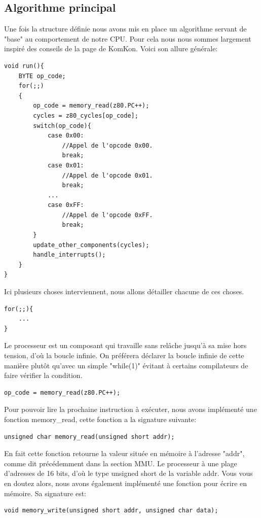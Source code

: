\documentclass[french]{report}
\begin{document}
\subsection{Algorithme principal}
Une fois la structure définie nous avons mis en place un algorithme servant de "base" au comportement de notre CPU. Pour cela nous nous sommes largement inspiré des conseils de la page de KomKon\cite{komkon}. Voici son allure générale:
 \begin{lstlisting}
void run(){
	BYTE op_code;
	for(;;)
	{
		op_code = memory_read(z80.PC++);
		cycles = z80_cycles[op_code];
		switch(op_code){	
			case 0x00:
				//Appel de l'opcode 0x00.
				break;
			case 0x01:
				//Appel de l'opcode 0x01.
				break;
			...
			case 0xFF:
				//Appel de l'opcode 0xFF.
				break;
		}
		update_other_components(cycles);
		handle_interrupts();
	}
}
 \end{lstlisting}		
Ici plusieurs choses interviennent, nous allons détailler chacune de ces choses.
\begin{lstlisting}
for(;;){
	...
}
\end{lstlisting}
Le processeur est un composant qui travaille sans relâche jusqu'à sa mise hors tension, d'où la boucle infinie. On préférera déclarer la boucle infinie de cette manière plutôt qu'avec un simple "while(1)" évitant à certains compilateurs de faire vérifier la condition.
\begin{lstlisting}
op_code = memory_read(z80.PC++);
\end{lstlisting}
Pour pouvoir lire la prochaine instruction à exécuter, nous avons implémenté une fonction memory\_read, cette fonction a la signature suivante:
\begin{lstlisting}
unsigned char memory_read(unsigned short addr);
\end{lstlisting}
En fait cette fonction retourne la valeur située en mémoire à l'adresse "addr", comme dit précédemment dans la section MMU. Le processeur à une plage d'adresses de 16 bits, d'où le type unsigned short de la variable addr.
Vous vous en doutez alors, nous avons également implémenté une fonction pour écrire en mémoire. Sa signature est:
\begin{lstlisting}
void memory_write(unsigned short addr, unsigned char data);
\end{lstlisting}
\end{document}
